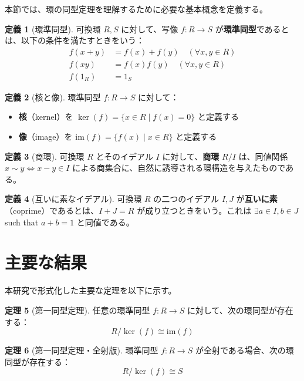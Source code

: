 \documentclass[uplatex, a4paper]{jlreq}
\theoremstyle{definition}
\newtheorem{theorem}{定理}[section]
\newtheorem{definition}[theorem]{定義}
\begin{document}
本節では、環の同型定理を理解するために必要な基本概念を定義する。

\begin{definition}[環準同型]
可換環 $R, S$ に対して、写像 $f: R \to S$ が\textbf{環準同型}であるとは、以下の条件を満たすときをいう：
\begin{align}
f(x + y) &= f(x) + f(y) \quad (\forall x, y \in R) \\
f(xy) &= f(x)f(y) \quad (\forall x, y \in R) \\
f(1_R) &= 1_S
\end{align}
\end{definition}

\begin{definition}[核と像]
環準同型 $f: R \to S$ に対して：
\begin{itemize}
\item \textbf{核}（kernel）を $\ker(f) = \{x \in R \mid f(x) = 0\}$ と定義する
\item \textbf{像}（image）を $\mathrm{im}(f) = \{f(x) \mid x \in R\}$ と定義する
\end{itemize}
\end{definition}

\begin{definition}[商環]
可換環 $R$ とそのイデアル $I$ に対して、\textbf{商環} $R/I$ は、同値関係 $x \sim y \iff x - y \in I$ による商集合に、自然に誘導される環構造を与えたものである。
\end{definition}

\begin{definition}[互いに素なイデアル]
可換環 $R$ の二つのイデアル $I, J$ が\textbf{互いに素}（coprime）であるとは、$I + J = R$ が成り立つときをいう。これは $\exists a \in I, b \in J$ such that $a + b = 1$ と同値である。
\end{definition}

\section{主要な結果}

本研究で形式化した主要な定理を以下に示す。

\begin{theorem}[第一同型定理]\label{thm:first}
任意の環準同型 $f: R \to S$ に対して、次の環同型が存在する：
\[
R/\ker(f) \cong \mathrm{im}(f)
\]
\end{theorem}

\begin{theorem}[第一同型定理・全射版]\label{thm:first-surjective}
環準同型 $f: R \to S$ が全射である場合、次の環同型が存在する：
\[
R/\ker(f) \cong S
\]
\end{theorem}
\end{document}
